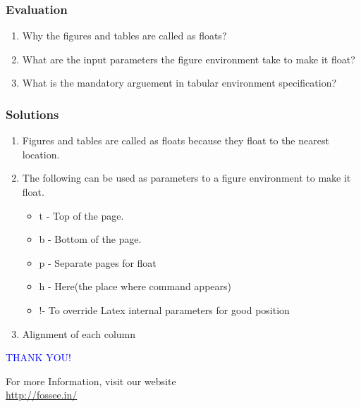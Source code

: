 \documentclass{beamer}
\begin{document}
\begin{frame}[fragile]
\frametitle{Evaluation}
\begin{enumerate}
\item Why the figures and tables are called as floats?
\item What are the input parameters the figure environment take to make it float?
\item What is the mandatory arguement in tabular environment specification?
\end{enumerate}
\end{frame}
\begin{frame}

\frametitle{Solutions}
\begin{enumerate}
\vspace{15pt}
\item Figures and tables are called as floats because they float to the nearest location.
\item The following can be used as parameters to a figure environment to make it float.
\begin{itemize}
\item t - Top of the page.
\item b - Bottom of the page.
\item p - Separate pages for float
\item h - Here(the place where command appears)
\item !- To override Latex internal parameters for good position
\end{itemize}

\item Alignment of each column
\end{enumerate}
\end{frame}

\begin{frame}

\begin{block}{}
  \begin{center}
  \textcolor{blue}{\Large THANK YOU!} 
  \end{center}
  \end{block}
\begin{block}{}
  \begin{center}
    For more Information, visit our website\\
    \url{http://fossee.in/}
  \end{center}  
  \end{block}
\end{frame}
\end{document}
